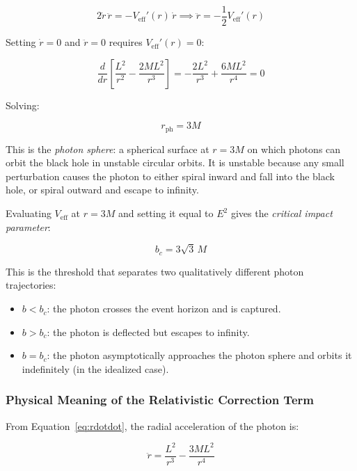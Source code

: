 \documentclass[12pt,a4paper]{article}
\begin{document}
\begin{equation}
    2\dot{r}\,\ddot{r} = -V_\text{eff}'(r)\,\dot{r}
    \implies
    \ddot{r} = -\frac{1}{2}V_\text{eff}'(r)
    \label{eq:rdotdot}
\end{equation}

Setting $\dot{r} = 0$ and $\ddot{r} = 0$ requires $V_\text{eff}'(r) = 0$:

\begin{equation}
    \frac{d}{dr}\left[\frac{L^2}{r^2} - \frac{2ML^2}{r^3}\right]
    = -\frac{2L^2}{r^3} + \frac{6ML^2}{r^4} = 0
\end{equation}

Solving:

\begin{equation}
    r_\text{ph} = 3M
    \label{eq:photon_sphere}
\end{equation}

This is the \textit{photon sphere}: a spherical surface at $r = 3M$ on which photons can orbit the black hole in unstable circular orbits. It is unstable because any small perturbation causes the photon to either spiral inward and fall into the black hole, or spiral outward and escape to infinity.

Evaluating $V_\text{eff}$ at $r = 3M$ and setting it equal to $E^2$ gives the \textit{critical impact parameter}:

\begin{equation}
    b_c = 3\sqrt{3}\,M
    \label{eq:bcrit}
\end{equation}

This is the threshold that separates two qualitatively different photon trajectories:
\begin{itemize}
    \item $b < b_c$: the photon crosses the event horizon and is captured.
    \item $b > b_c$: the photon is deflected but escapes to infinity.
    \item $b = b_c$: the photon asymptotically approaches the photon sphere
    and orbits it indefinitely (in the idealized case).
\end{itemize}

\subsubsection{Physical Meaning of the Relativistic Correction Term}
From Equation~\eqref{eq:rdotdot}, the radial acceleration of the photon is:

\begin{equation}
    \ddot{r} = \frac{L^2}{r^3} - \frac{3ML^2}{r^4}
    \label{eq:rdotdot_explicit}
\end{equation}
\end{document}
